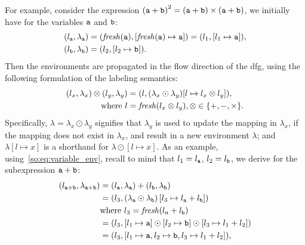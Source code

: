For example, consider the expression ${(\texttt{a} + \texttt{b})}^2 = (\texttt{a} + \texttt{b})
\times (\texttt{a} + \texttt{b})$, we initially have for the variables $\texttt{a}$ and
$\texttt{b}$:
\begin{equation}
    \begin{aligned}
        (l_{\texttt{a}}, \lambda_{\texttt{a}})
            &= (\operatorname{\mathit{fresh}}(\texttt{a}), [\operatorname{\mathit{fresh}}(\texttt{a})\mapsto{\texttt{a}}])
             = (l_1, [l_1 \mapsto \texttt{a}]), \\
        (l_{\texttt{b}}, \lambda_{\texttt{b}}) &= (l_2, [l_2 \mapsto \texttt{b}]).
    \end{aligned}
    \label{so:eq:variable_env}
\end{equation}
Then the environments are propagated in the flow direction of the \gls{dfg},
using the following formulation of the labeling semantics:
\begin{equation}
    \begin{aligned}
        (l_x, \lambda_x) \otimes (l_y, \lambda_y)
            &= (l, (\lambda_x\odot\lambda_y)
                      [l\mapsto{l_x \otimes l_y}]), \\
            \text{where~} l &= \operatorname{\mathit{fresh}}(l_x \otimes l_y),
                          \otimes\in\{+, -, \times\}.
    \end{aligned}
    \label{so:eq:labeling_semantics}
\end{equation}
Specifically, $\lambda=\lambda_x\odot\lambda_y$ signifies that $\lambda_y$
is used to update the mapping in $\lambda_x$, if the mapping does not
exist in $\lambda_x$, and result in a new environment $\lambda$; and
$\lambda[l\mapsto{x}]$ is a shorthand for $\lambda\odot[l\mapsto{x}]$.  As an
example, using~\eqref{so:eq:variable_env}, recall to mind that $l_1 = l_{\texttt{a}}$,
$l_2 = l_{\texttt{b}}$, we derive for the subexpression $\texttt{a} + \texttt{b}$:
\begin{equation}
    \begin{aligned}
        (l_{\texttt{a} + \texttt{b}}, \lambda_{\texttt{a} + \texttt{b}})
            &= (l_{\texttt{a}}, \lambda_{\texttt{a}}) + (l_{\texttt{b}}, \lambda_{\texttt{b}}) \\
            &= \left(l_3,
                \left( \lambda_{\texttt{a}} \odot \lambda_{\texttt{b}} \right)
                    \left[ l_3\mapsto{l_{\texttt{a}}+ l_{\texttt{b}}} \right]
               \right) \\
            &  \text{where~} l_3 = \operatorname{\mathit{fresh}}(l_a + l_{\texttt{b}}) \\
            &= (l_3, [l_1\mapsto{\texttt{a}}]\odot
                     [l_2\mapsto{\texttt{b}}]\odot
                     [l_3\mapsto{l_1 + l_2}]) \\
            &= (l_3, [
                 l_1\mapsto{\texttt{a}},
                 l_2\mapsto{\texttt{b}},
                 l_3\mapsto{l_1 + l_2}
               ]),
    \end{aligned}
\end{equation}
